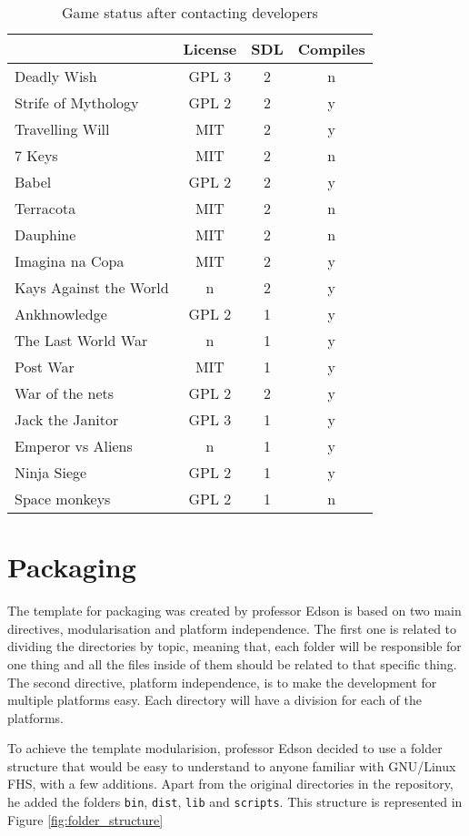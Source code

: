 \begin{table}[h!]
\centering
\caption{Game status after contacting developers}
\label{tab:final_games}
\begin{tabular}{lccc}
\toprule
\textbf{} & \multicolumn{1}{l}{\textbf{License}} & \multicolumn{1}{l}{\textbf{SDL}} & \multicolumn{1}{l}{\textbf{Compiles}} \\
\midrule
Deadly Wish & GPL 3 & 2 & n \\
Strife of Mythology & GPL 2 & 2 & y \\
Travelling Will & MIT & 2 & y \\
7 Keys & MIT & 2 & n \\
Babel & GPL 2 & 2 & y \\
Terracota & MIT & 2 & n \\
Dauphine & MIT & 2 & n \\
Imagina na Copa & MIT & 2 & y \\
Kays Against the World & n & 2 & y \\
Ankhnowledge & GPL 2 & 1 & y \\
The Last World War & n & 1 & y \\
Post War & MIT & 1 & y \\
War of the nets & GPL 2 & 2 & y \\
Jack the Janitor & GPL 3 & 1 & y \\
Emperor vs Aliens & n & 1 & y \\
Ninja Siege & GPL 2 & 1 & y \\
Space monkeys & GPL 2 & 1 & n \\
\bottomrule
\end{tabular}
\end{table}


\section{Packaging}
\label{sec:packaging}

The template for packaging was created by professor Edson is based on two main directives, modularisation and platform independence. The first one is related to dividing the directories by topic, meaning that, each folder will be responsible for one thing and all the files inside of them should be related to that specific thing. The second directive, platform independence, is to make the development for multiple platforms easy. Each directory will have a division for each of the platforms.

To achieve the template modularision, professor Edson decided to use a folder structure that would be easy to understand to anyone familiar with GNU/Linux FHS, with a few additions. Apart from the original directories in the repository, he added the folders \texttt{bin}, \texttt{dist}, \texttt{lib} and \texttt{scripts}. This structure is represented in Figure \ref{fig:folder_structure}

